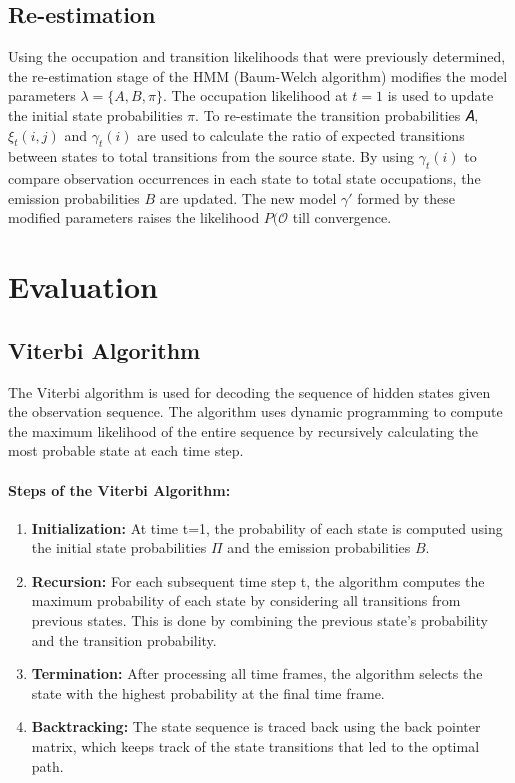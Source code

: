 \documentclass{article}
\begin{document}
\subsection{Re-estimation}

Using the occupation and transition likelihoods that were previously determined, the re-estimation stage of the HMM (Baum-Welch algorithm) modifies the model parameters $\lambda = \{A, B, \pi\}$. The occupation likelihood at $t = 1$ is used to update the initial state probabilities $\pi$. To re-estimate the transition probabilities 𝐴, $\xi_t(i,j)$ and $\gamma_t(i)$ are used to calculate the ratio of expected transitions between states to total transitions from the source state. By using $\gamma_t(i)$ to compare observation occurrences in each state to total state occupations, the emission probabilities $B$ are updated. The new model $\gamma'$ formed by these modified parameters raises the likelihood $P(\mathcal{O}$ till convergence.






\section{Evaluation}

\subsection{Viterbi Algorithm}
The Viterbi algorithm is used for decoding the sequence of hidden states given the observation sequence. The algorithm uses dynamic programming to compute the maximum likelihood of the entire sequence by recursively calculating the most probable state at each time step.

\paragraph{Steps of the Viterbi Algorithm:}
\begin{enumerate}
\item \textbf{Initialization:} At time t=1, the probability of each state is computed using the initial state probabilities $\Pi$ and the emission probabilities $B$.
\item \textbf{Recursion:} For each subsequent time step t, the algorithm computes the maximum probability of each state by considering all transitions from previous states. This is done by combining the previous state’s probability and the transition probability.
\item \textbf{Termination:} After processing all time frames, the algorithm selects the state with the highest probability at the final time frame.
\item \textbf{Backtracking:} The state sequence is traced back using the back pointer matrix, which keeps track of the state transitions that led to the optimal path.
\end{enumerate}
\end{document}
